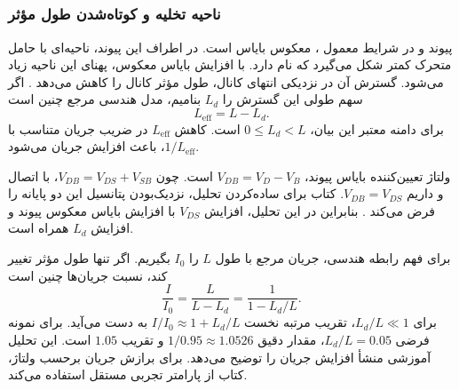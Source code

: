 \subsection{}
\label{sec:clm}
\subsubsection*{ناحیه تخلیه و کوتاه‌شدن طول مؤثر}
پیوند  و  در شرایط معمول ، معکوس بایاس
است. در اطراف این پیوند، ناحیه‌ای با حامل متحرک کمتر شکل می‌گیرد که
 نام دارد. با افزایش بایاس معکوس، پهنای این ناحیه
زیاد می‌شود. گسترش آن در نزدیکی انتهای کانال، طول مؤثر کانال را کاهش
می‌دهد \cite[بخش  و شکل ]{weste}
\cite[اسلاید ۱۳]{nonideal}. اگر سهم طولی این گسترش را \(L_d\) بنامیم،
مدل هندسی مرجع چنین است
\begin{equation}
 L_{\mathrm{eff}}=L-L_d.
 \label{eq:effective-length}
\end{equation}
برای دامنه معتبر این بیان، \(0\le L_d<L\) است. کاهش
\(L_{\mathrm{eff}}\) در ضریب جریان متناسب با \(1/L_{\mathrm{eff}}\)،
باعث افزایش جریان می‌شود.

ولتاژ تعیین‌کننده بایاس پیوند، \(V_{DB}=V_D-V_B\) است. چون
\(V_{DB}=V_{DS}+V_{SB}\)، با اتصال  و  داریم
\(V_{DB}=V_{DS}\). کتاب برای ساده‌کردن تحلیل، نزدیک‌بودن پتانسیل این
دو پایانه را فرض می‌کند \cite[صفحه چاپی ۷۸]{weste}. بنابراین در این
تحلیل، افزایش \(V_{DS}\) با افزایش بایاس معکوس پیوند و افزایش \(L_d\)
همراه است.

برای فهم رابطه هندسی، جریان مرجع با طول \(L\) را
\(I_0\) بگیریم. اگر تنها طول مؤثر تغییر کند، نسبت جریان‌ها چنین است
\begin{equation}
 \frac{I}{I_0}=\frac{L}{L-L_d}
 =\frac{1}{1-L_d/L}.
 \label{eq:length-current-ratio}
\end{equation}
برای \(L_d/L\ll1\)، تقریب مرتبه نخست
\(I/I_0\approx1+L_d/L\) به دست می‌آید. برای نمونه فرضی
\(L_d/L=0.05\)، مقدار دقیق \(1/0.95\approx1.0526\) و تقریب
\(1.05\) است. این تحلیل آموزشی منشأ افزایش جریان را توضیح می‌دهد.
برای برازش جریان برحسب ولتاژ، کتاب از پارامتر تجربی مستقل استفاده می‌کند.

